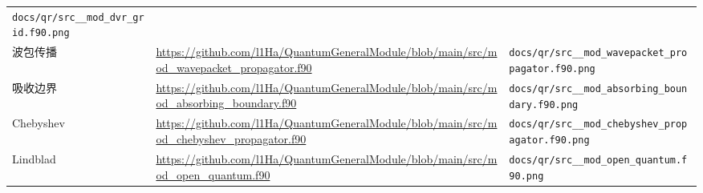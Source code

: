 \documentclass[
  a4paper,
]{ctexbook}
\begin{document}
\begin{longtable}[]{@{}lll@{}}
\begin{minipage}[t]{0.30\columnwidth}
\texttt{docs/qr/src\_\_mod\_dvr\_grid.f90.png}\strut
\end{minipage}\tabularnewline
\begin{minipage}[t]{0.30\columnwidth}\raggedright
波包传播\strut
\end{minipage} & \begin{minipage}[t]{0.30\columnwidth}\raggedright
\url{https://github.com/l1Ha/QuantumGeneralModule/blob/main/src/mod_wavepacket_propagator.f90}\strut
\end{minipage} & \begin{minipage}[t]{0.30\columnwidth}\raggedright
\texttt{docs/qr/src\_\_mod\_wavepacket\_propagator.f90.png}\strut
\end{minipage}\tabularnewline
\begin{minipage}[t]{0.30\columnwidth}\raggedright
吸收边界\strut
\end{minipage} & \begin{minipage}[t]{0.30\columnwidth}\raggedright
\url{https://github.com/l1Ha/QuantumGeneralModule/blob/main/src/mod_absorbing_boundary.f90}\strut
\end{minipage} & \begin{minipage}[t]{0.30\columnwidth}\raggedright
\texttt{docs/qr/src\_\_mod\_absorbing\_boundary.f90.png}\strut
\end{minipage}\tabularnewline
\begin{minipage}[t]{0.30\columnwidth}\raggedright
Chebyshev\strut
\end{minipage} & \begin{minipage}[t]{0.30\columnwidth}\raggedright
\url{https://github.com/l1Ha/QuantumGeneralModule/blob/main/src/mod_chebyshev_propagator.f90}\strut
\end{minipage} & \begin{minipage}[t]{0.30\columnwidth}\raggedright
\texttt{docs/qr/src\_\_mod\_chebyshev\_propagator.f90.png}\strut
\end{minipage}\tabularnewline
\begin{minipage}[t]{0.30\columnwidth}\raggedright
Lindblad\strut
\end{minipage} & \begin{minipage}[t]{0.30\columnwidth}\raggedright
\url{https://github.com/l1Ha/QuantumGeneralModule/blob/main/src/mod_open_quantum.f90}\strut
\end{minipage} & \begin{minipage}[t]{0.30\columnwidth}\raggedright
\texttt{docs/qr/src\_\_mod\_open\_quantum.f90.png}\strut
\end{minipage}\tabularnewline

\end{longtable}
\end{document}
